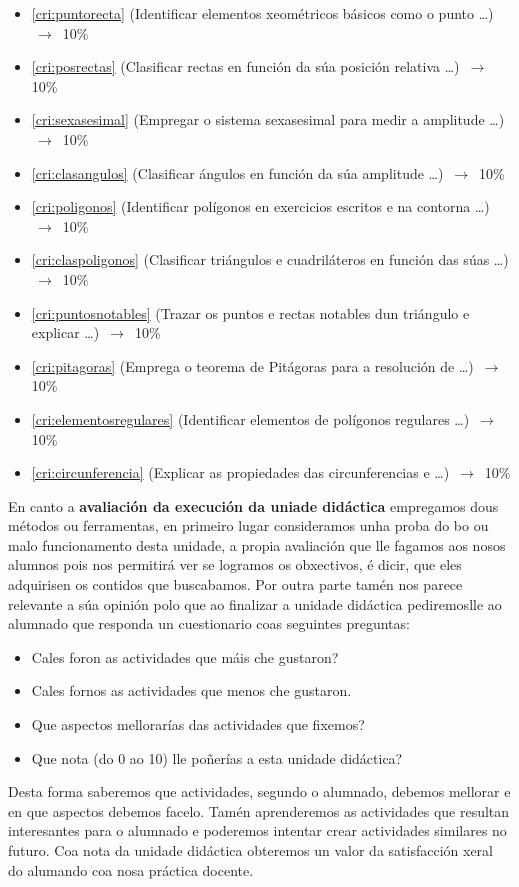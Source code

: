 \begin{itemize}
    \item \ref{cri:puntorecta}         (Identificar elementos xeométricos básicos como o punto \dots) $\,\to\,$ 10\%
    \item \ref{cri:posrectas}          (Clasificar rectas en función da súa posición relativa \dots) $\,\to\,$ 10\%
    \item \ref{cri:sexasesimal}        (Empregar o sistema sexasesimal para medir a amplitude \dots) $\,\to\,$ 10\%
    \item \ref{cri:clasangulos}        (Clasificar ángulos en función da súa amplitude \dots) $\,\to\,$ 10\%
    \item \ref{cri:poligonos}          (Identificar polígonos en exercicios escritos e na contorna \dots) $\,\to\,$ 10\%
    \item \ref{cri:claspoligonos}      (Clasificar triángulos e cuadriláteros en función das súas  \dots) $\,\to\,$ 10\%
    \item \ref{cri:puntosnotables}     (Trazar os puntos e rectas notables dun triángulo e explicar  \dots) $\,\to\,$ 10\%
    \item \ref{cri:pitagoras}          (Emprega o teorema de Pitágoras para a resolución de   \dots) $\,\to\,$ 10\%
    \item \ref{cri:elementosregulares} (Identificar elementos de polígonos regulares  \dots) $\,\to\,$ 10\%
    \item \ref{cri:circunferencia}     (Explicar as propiedades das circunferencias e  \dots) $\,\to\,$ 10\%
\end{itemize}

En canto a \textbf{avaliación da execución da uniade didáctica} empregamos dous métodos ou ferramentas, en primeiro lugar consideramos unha proba do bo ou malo funcionamento desta unidade, a propia avaliación que lle fagamos aos nosos alumnos pois nos permitirá ver se logramos os obxectivos, é dicir, que eles adquirisen os contidos que buscabamos. Por outra parte tamén nos parece relevante a súa opinión polo que ao finalizar a unidade didáctica pediremoslle ao alumnado que responda un cuestionario coas seguintes preguntas:

\begin{itemize}
    \item Cales foron  as actividades que máis che gustaron?
    \item Cales fornos as actividades que menos che gustaron.
    \item Que aspectos mellorarías das actividades que fixemos?
    \item Que nota (do 0 ao 10) lle poñerías a esta unidade didáctica?
\end{itemize}

Desta forma saberemos que actividades, segundo o alumnado, debemos mellorar e en que aspectos debemos facelo. Tamén aprenderemos as actividades que resultan interesantes para o alumnado e poderemos intentar crear actividades similares no futuro. Coa nota da unidade didáctica obteremos un valor da satisfacción xeral do alumando coa nosa práctica docente.
